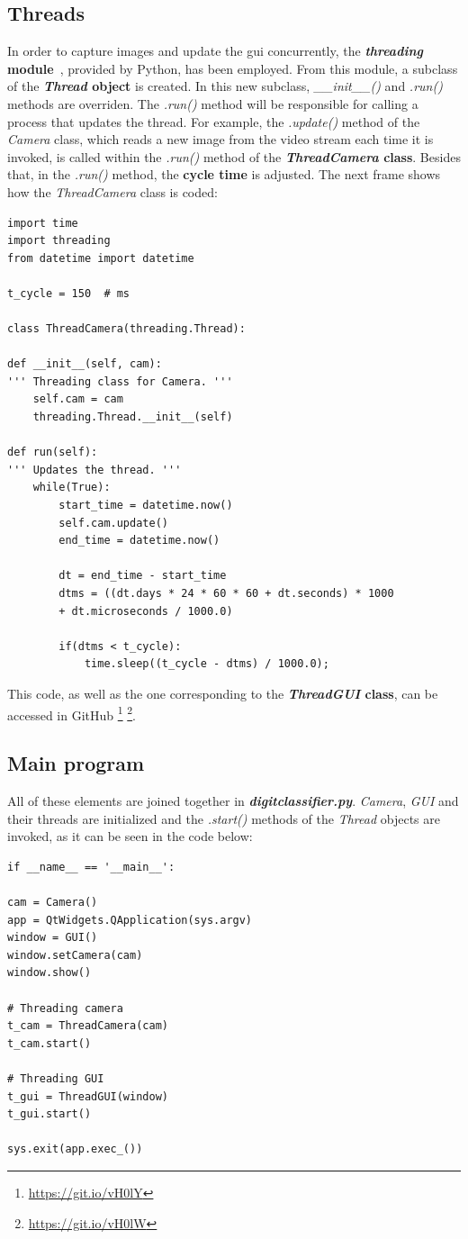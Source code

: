 \subsection{Threads} 
In order to capture images and update the \gls{gui} concurrently, the \textbf{\textit{threading} module}~\cite{threading}, provided by Python, has been employed. From this module, a subclass of the \textbf{\textit{Thread} object} is created. In this new subclass, \textit{\_\_init\_\_()} and \textit{.run()} methods are overriden. The \textit{.run()} method will be responsible for calling a process that updates the thread. For example, the \textit{.update()} method of the \textit{Camera} class, which reads a new image from the video stream each time it is invoked, is called within the \textit{.run()} method of the \textbf{\textit{ThreadCamera} class}. Besides that, in the \textit{.run()} method, the \textbf{cycle time} is adjusted. The next frame shows how the \textit{ThreadCamera} class is coded:
\begin{lstlisting}
import time
import threading
from datetime import datetime

t_cycle = 150  # ms

class ThreadCamera(threading.Thread):

def __init__(self, cam):
''' Threading class for Camera. '''
	self.cam = cam
	threading.Thread.__init__(self)

def run(self):
''' Updates the thread. '''
	while(True):
		start_time = datetime.now()
		self.cam.update()
		end_time = datetime.now()
		
		dt = end_time - start_time
		dtms = ((dt.days * 24 * 60 * 60 + dt.seconds) * 1000
		+ dt.microseconds / 1000.0)
		
		if(dtms < t_cycle):
			time.sleep((t_cycle - dtms) / 1000.0);
\end{lstlisting}
This code, as well as the one corresponding to the \textbf{\textit{ThreadGUI} class}, can be accessed in GitHub \footnote{\url{https://git.io/vH0lY}} \footnote{\url{https://git.io/vH0lW}}.

\subsection{Main program}
All of these elements are joined together in \textbf{\textit{digitclassifier.py}}. \textit{Camera}, \textit{GUI} and their threads are initialized and the \textit{.start()} methods of the \textit{Thread} objects are invoked, as it can be seen in the code below:
\begin{lstlisting}
if __name__ == '__main__':

cam = Camera()
app = QtWidgets.QApplication(sys.argv)
window = GUI()
window.setCamera(cam)
window.show()

# Threading camera
t_cam = ThreadCamera(cam)
t_cam.start()

# Threading GUI
t_gui = ThreadGUI(window)
t_gui.start()

sys.exit(app.exec_())
\end{lstlisting}

